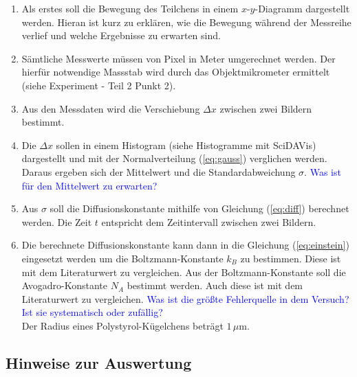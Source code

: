 \documentclass[a4paper, 12pt]{scrartcl}
\begin{document}
\begin{enumerate}

  \item Als erstes soll die Bewegung des Teilchens in einem $x$-$y$-Diagramm dargestellt werden. Hieran ist kurz zu erklären, wie die Bewegung während der Messreihe verlief und welche Ergebnisse zu erwarten sind.

  \item Sämtliche Messwerte müssen von Pixel in Meter umgerechnet werden. Der hierfür notwendige Massstab wird durch das Objektmikrometer ermittelt (siehe Experiment - Teil 2 Punkt 2).

  \item Aus den Messdaten wird die Verschiebung $\Delta x$ zwischen zwei Bildern bestimmt.

  \item Die $\Delta x$ sollen in einem Histogram (siehe Histogramme mit SciDAVis) dargestellt und mit der Normalverteilung (\ref{eq:gauss}) verglichen werden. Daraus ergeben sich der Mittelwert und die Standardabweichung $\sigma$. \textcolor{blue}{Was ist für den Mittelwert zu erwarten?}

  \item Aus $\sigma$ soll die Diffusionskonstante mithilfe von Gleichung (\ref{eq:diff}) berechnet werden. Die Zeit $t$ entspricht dem Zeitintervall zwischen zwei Bildern.

  \item Die berechnete Diffusionskonstante kann dann in die Gleichung (\ref{eq:einstein}) eingesetzt werden um die Boltzmann-Konstante $k_B$ zu bestimmen. Diese ist mit dem Literaturwert zu vergleichen. Aus der Boltzmann-Konstante soll die Avogadro-Konstante $N_A$ bestimmt werden. Auch diese ist mit dem Literaturwert zu vergleichen. \textcolor{blue}{Was ist die größte Fehlerquelle in dem Versuch? Ist sie systematisch oder zufällig?}\\
  Der Radius eines Polystyrol-Kügelchens beträgt $1\,\mu$m.

\end{enumerate}


\subsection*{Hinweise zur Auswertung}
\end{document}
